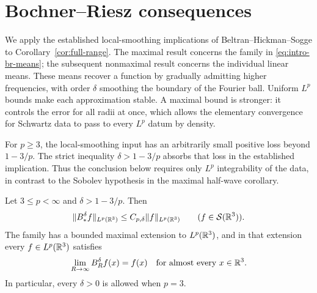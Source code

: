 \section{Bochner--Riesz consequences}\label{sec:bochner-riesz}

We apply the established local-smoothing implications of
Beltran--Hickman--Sogge to Corollary~\ref{cor:full-range}. The maximal
result concerns the family in \eqref{eq:intro-br-means}; the subsequent
nonmaximal result concerns the individual linear means.
These means recover a function by gradually admitting higher
frequencies, with order $\delta$ smoothing the boundary of the Fourier
ball. Uniform $L^p$ bounds make each approximation stable. A maximal
bound is stronger: it controls the error for all radii at once, which
allows the elementary convergence for Schwartz data to pass to every
$L^p$ datum by density.

For $p\ge3$, the local-smoothing input has an arbitrarily small
positive loss beyond $1-3/p$. The strict inequality
$\delta>1-3/p$ absorbs that loss in the established implication.
Thus the conclusion below requires only $L^p$ integrability of the
data, in contrast to the Sobolev hypothesis in the maximal half-wave
corollary.

\begin{theorem}
\label{thm:br-maximal}
Let $3\le p<\infty$ and $\delta>1-3/p$. Then
\begin{equation}\label{eq:br-maximal}
 \lVert B_*^\delta f\rVert_{L^p(\mathbb R^3)}
 \le C_{p,\delta}\lVert f\rVert_{L^p(\mathbb R^3)}
 \qquad(f\in\mathcal S(\mathbb R^3)).
\end{equation}
The family has a bounded maximal extension to $L^p(\mathbb R^3)$, and in that
extension every $f\in L^p(\mathbb R^3)$ satisfies
\begin{equation}\label{eq:br-ae}
 \lim_{R\to\infty}B_R^\delta f(x)=f(x)
 \quad\text{for almost every }x\in\mathbb R^3.
\end{equation}
In particular, every $\delta>0$ is allowed when $p=3$.
\end{theorem}

